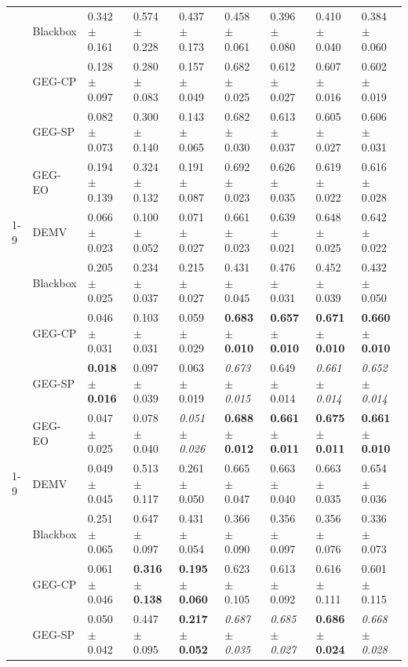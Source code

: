 \begin{table}
\begin{tabular}{lllllllll}
 & Blackbox & 0.342 $\pm$ 0.161 & 0.574 $\pm$ 0.228 & 0.437 $\pm$ 0.173 & 0.458 $\pm$ 0.061 & 0.396 $\pm$ 0.080 & 0.410 $\pm$ 0.040 & 0.384 $\pm$ 0.060 \\
 & GEG-CP & 0.128 $\pm$ 0.097 & 0.280 $\pm$ 0.083 & 0.157 $\pm$ 0.049 & 0.682 $\pm$ 0.025 & 0.612 $\pm$ 0.027 & 0.607 $\pm$ 0.016 & 0.602 $\pm$ 0.019 \\
 & GEG-SP & 0.082 $\pm$ 0.073 & 0.300 $\pm$ 0.140 & 0.143 $\pm$ 0.065 & 0.682 $\pm$ 0.030 & 0.613 $\pm$ 0.037 & 0.605 $\pm$ 0.027 & 0.606 $\pm$ 0.031 \\
 & GEG-EO & 0.194 $\pm$ 0.139 & 0.324 $\pm$ 0.132 & 0.191 $\pm$ 0.087 & 0.692 $\pm$ 0.023 & 0.626 $\pm$ 0.035 & 0.619 $\pm$ 0.022 & 0.616 $\pm$ 0.028 \\
\cline{1-9}
\multirow[t]{5}{*}{law} & DEMV & 0.066 $\pm$ 0.023 & 0.100 $\pm$ 0.052 & 0.071 $\pm$ 0.027 & 0.661 $\pm$ 0.023 & 0.639 $\pm$ 0.021 & 0.648 $\pm$ 0.025 & 0.642 $\pm$ 0.022 \\
 & Blackbox & 0.205 $\pm$ 0.025 & 0.234 $\pm$ 0.037 & 0.215 $\pm$ 0.027 & 0.431 $\pm$ 0.045 & 0.476 $\pm$ 0.031 & 0.452 $\pm$ 0.039 & 0.432 $\pm$ 0.050 \\
 & GEG-CP & 0.046 $\pm$ 0.031 & 0.103 $\pm$ 0.031 & 0.059 $\pm$ 0.029 & \textbf{0.683 $\pm$ 0.010} & \textbf{0.657 $\pm$ 0.010} & \textbf{0.671 $\pm$ 0.010} & \textbf{0.660 $\pm$ 0.010} \\
 & GEG-SP & \textbf{0.018 $\pm$ 0.016} & 0.097 $\pm$ 0.039 & 0.063 $\pm$ 0.019 & \textit{0.673 $\pm$ 0.015} & 0.649 $\pm$ 0.014 & \textit{0.661 $\pm$ 0.014} & \textit{0.652 $\pm$ 0.014} \\
 & GEG-EO & 0.047 $\pm$ 0.025 & 0.078 $\pm$ 0.040 & \textit{0.051 $\pm$ 0.026} & \textbf{0.688 $\pm$ 0.012} & \textbf{0.661 $\pm$ 0.011} & \textbf{0.675 $\pm$ 0.011} & \textbf{0.661 $\pm$ 0.010} \\
\cline{1-9}
\multirow[t]{5}{*}{obesity} & DEMV & 0.049 $\pm$ 0.045 & 0.513 $\pm$ 0.117 & 0.261 $\pm$ 0.050 & 0.665 $\pm$ 0.047 & 0.663 $\pm$ 0.040 & 0.663 $\pm$ 0.035 & 0.654 $\pm$ 0.036 \\
 & Blackbox & 0.251 $\pm$ 0.065 & 0.647 $\pm$ 0.097 & 0.431 $\pm$ 0.054 & 0.366 $\pm$ 0.090 & 0.356 $\pm$ 0.097 & 0.356 $\pm$ 0.076 & 0.336 $\pm$ 0.073 \\
 & GEG-CP & 0.061 $\pm$ 0.046 & \textbf{0.316 $\pm$ 0.138} & \textbf{0.195 $\pm$ 0.060} & 0.623 $\pm$ 0.105 & 0.613 $\pm$ 0.092 & 0.616 $\pm$ 0.111 & 0.601 $\pm$ 0.115 \\
 & GEG-SP & 0.050 $\pm$ 0.042 & 0.447 $\pm$ 0.095 & \textbf{0.217 $\pm$ 0.052} & \textit{0.687 $\pm$ 0.035} & \textit{0.685 $\pm$ 0.027} & \textbf{0.686 $\pm$ 0.024} & \textit{0.668 $\pm$ 0.028} \\

\end{tabular}
\end{table}
